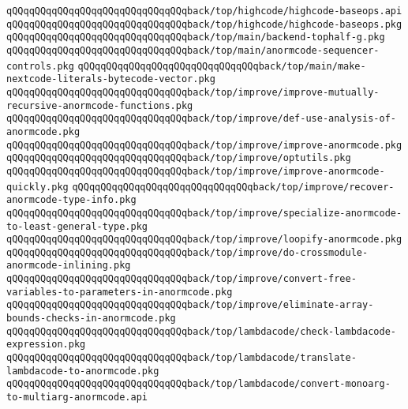 \verb|qQQqqQQqqQQqqQQqqQQqqQQqqQQqqQQqback/top/highcode/highcode-baseops.api|\newline
\verb|qQQqqQQqqQQqqQQqqQQqqQQqqQQqqQQqback/top/highcode/highcode-baseops.pkg|\newline
\verb|qQQqqQQqqQQqqQQqqQQqqQQqqQQqqQQqback/top/main/backend-tophalf-g.pkg|\newline
\verb|qQQqqQQqqQQqqQQqqQQqqQQqqQQqqQQqback/top/main/anormcode-sequencer-controls.pkg|\newline
\verb|qQQqqQQqqQQqqQQqqQQqqQQqqQQqqQQqback/top/main/make-nextcode-literals-bytecode-vector.pkg|\newline
\verb|qQQqqQQqqQQqqQQqqQQqqQQqqQQqqQQqback/top/improve/improve-mutually-recursive-anormcode-functions.pkg|\newline
\verb|qQQqqQQqqQQqqQQqqQQqqQQqqQQqqQQqback/top/improve/def-use-analysis-of-anormcode.pkg|\newline
\verb|qQQqqQQqqQQqqQQqqQQqqQQqqQQqqQQqback/top/improve/improve-anormcode.pkg|\newline
\verb|qQQqqQQqqQQqqQQqqQQqqQQqqQQqqQQqback/top/improve/optutils.pkg|\newline
\verb|qQQqqQQqqQQqqQQqqQQqqQQqqQQqqQQqback/top/improve/improve-anormcode-quickly.pkg|\newline
\verb|qQQqqQQqqQQqqQQqqQQqqQQqqQQqqQQqback/top/improve/recover-anormcode-type-info.pkg|\newline
\verb|qQQqqQQqqQQqqQQqqQQqqQQqqQQqqQQqback/top/improve/specialize-anormcode-to-least-general-type.pkg|\newline
\verb|qQQqqQQqqQQqqQQqqQQqqQQqqQQqqQQqback/top/improve/loopify-anormcode.pkg|\newline
\verb|qQQqqQQqqQQqqQQqqQQqqQQqqQQqqQQqback/top/improve/do-crossmodule-anormcode-inlining.pkg|\newline
\verb|qQQqqQQqqQQqqQQqqQQqqQQqqQQqqQQqback/top/improve/convert-free-variables-to-parameters-in-anormcode.pkg|\newline
\verb|qQQqqQQqqQQqqQQqqQQqqQQqqQQqqQQqback/top/improve/eliminate-array-bounds-checks-in-anormcode.pkg|\newline
\verb|qQQqqQQqqQQqqQQqqQQqqQQqqQQqqQQqback/top/lambdacode/check-lambdacode-expression.pkg|\newline
\verb|qQQqqQQqqQQqqQQqqQQqqQQqqQQqqQQqback/top/lambdacode/translate-lambdacode-to-anormcode.pkg|\newline
\verb|qQQqqQQqqQQqqQQqqQQqqQQqqQQqqQQqback/top/lambdacode/convert-monoarg-to-multiarg-anormcode.api|\newline
